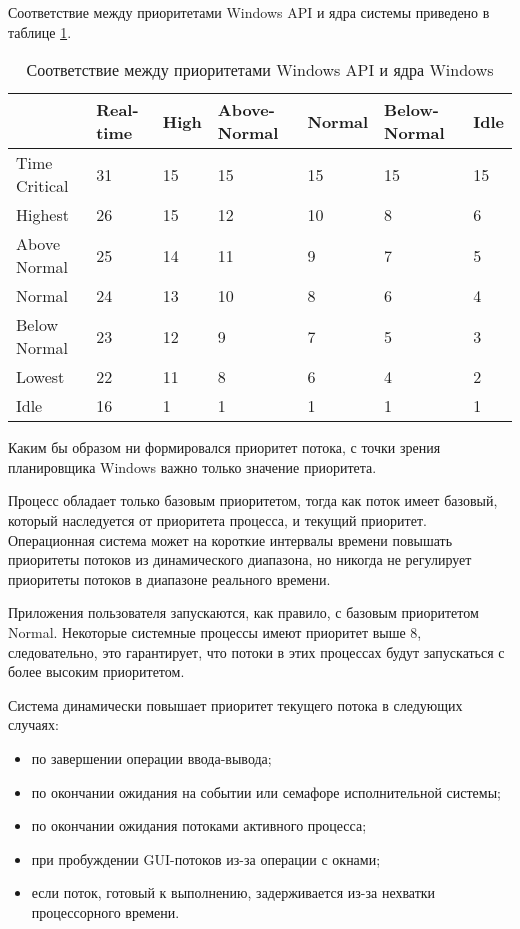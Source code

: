 \documentclass[a4paper,oneside,14pt]{extreport}
\begin{document}
Соответствие между приоритетами Windows API и ядра системы приведено в таблице \ref{tbl:priority}.

\begin{table}
\begin{center}
\begin{tabular}{|l|p{45pt}|p{45pt}|p{45pt}|p{45pt}|p{45pt}|p{45pt}|} 
	\hline
	{} & Real-time & High & Above-Normal & Normal & Below-Normal & Idle\\
	\hline
	Time Critical & 31 & 15 & 15 & 15 & 15 & 15 \\
	\hline
	Highest & 26 & 15 & 12 & 10 & 8 & 6 \\
	\hline
	Above Normal & 25 & 14 & 11 & 9 & 7 & 5 \\
	\hline
	Normal & 24 & 13 & 10 & 8 & 6 & 4 \\
	\hline
	Below Normal & 23 & 12 & 9 & 7 & 5 & 3 \\
	\hline
	Lowest & 22 & 11 & 8 & 6 & 4 & 2 \\
	\hline
	Idle & 16 & 1 & 1 & 1 & 1 & 1 \\
	\hline
\end{tabular}
\end{center}
\caption{Соответствие между приоритетами Windows API и ядра Windows}
\label{tbl:priority}
\end{table}

Каким бы образом ни формировался приоритет потока, с точки зрения планировщика Windows важно только значение приоритета.

Процесс обладает только базовым приоритетом, тогда как поток имеет базовый, который наследуется от приоритета процесса, и текущий приоритет. Операционная система может на короткие интервалы времени повышать приоритеты потоков из динамического диапазона, но никогда не регулирует приоритеты потоков в диапазоне реального времени.

Приложения пользователя запускаются, как правило, с базовым приоритетом Normal. Некоторые системные процессы имеют приоритет выше 8, следовательно, это гарантирует, что потоки в этих процессах будут запускаться с более высоким приоритетом.

Система динамически повышает приоритет текущего потока в следующих случаях:
\begin{itemize}
	\item по завершении операции ввода-вывода;
	\item по окончании ожидания на событии или семафоре исполнительной системы;
	\item по окончании ожидания потоками активного процесса;
	\item при пробуждении GUI-потоков из-за операции с окнами;
	\item если поток, готовый к выполнению, задерживается из-за нехватки процессорного времени.
\end{itemize}
\end{document}
